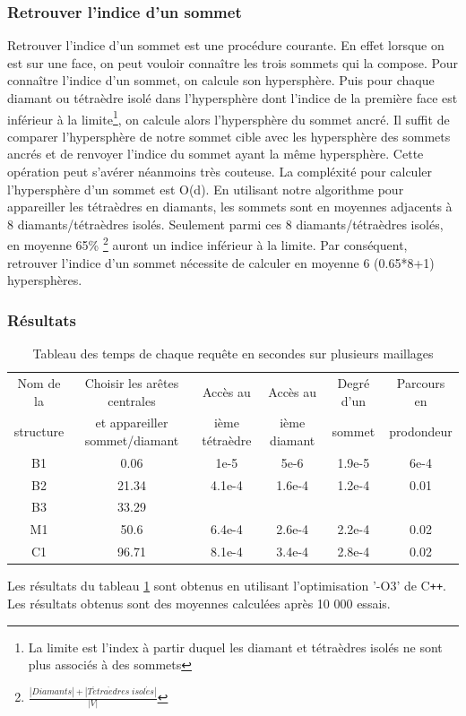 \documentclass[a4paper,11pt,openany]{article}
\begin{document}
\subsubsection{Retrouver l'indice d'un sommet}
\label{Retrouver l'indice d'un sommet}
\noindent
Retrouver l'indice d'un sommet est une procédure courante. En effet lorsque on est sur une face, on peut vouloir connaître les trois sommets qui la compose. Pour connaître l'indice d'un sommet, on calcule son hypersphère. Puis pour chaque diamant ou tétraèdre isolé dans l'hypersphère dont l'indice de la première face est inférieur à la limite\footnote{La limite est l'index à partir duquel les diamant et tétraèdres isolés ne sont plus associés à des sommets}, on calcule alors l'hypersphère du sommet ancré. Il suffit de comparer l'hypersphère de notre sommet cible avec les hypersphère des sommets ancrés et de renvoyer l'indice du sommet ayant la même hypersphère. Cette opération peut s'avérer néanmoins très couteuse. La compléxité pour calculer l'hypersphère d'un sommet est O(d). En utilisant notre algorithme pour appareiller les tétraèdres en diamants, les sommets sont en moyennes adjacents à 8 diamants/tétraèdres isolés. Seulement parmi ces 8 diamants/tétraèdres isolés, en moyenne 65\% \footnote{$\frac{|Diamants|+|T\acute{e}tra\grave{e}dres\; isol\acute{e}s|}{|V|}$} auront un indice inférieur à la limite. Par conséquent, retrouver l'indice d'un sommet nécessite de calculer en moyenne 6 (0.65*8+1) hypersphères.
\subsubsection{Résultats}
\noindent
\begin{table}[H]
\footnotesize
\centering
\begin{tabular}{| c | c | c | c| c |c |}
\hline
Nom de la  & Choisir les arêtes centrales & Accès au& Accès au & Degré d'un & Parcours en\\
structure & et appareiller sommet/diamant &ième tétraèdre& ième diamant &sommet&prodondeur\\
\hline
B1  & 0.06 & 1e-5 & 5e-6 & 1.9e-5 & 6e-4\\
B2 & 21.34 &  4.1e-4 & 1.6e-4 & 1.2e-4 & 0.01\\
B3 & 33.29 & & & & \\
M1  & 50.6 & 6.4e-4 & 2.6e-4 & 2.2e-4 & 0.02\\
C1  & 96.71 & 8.1e-4 & 3.4e-4 & 2.8e-4 & 0.02\\
\hline  
\end{tabular}
\label{Tab:results_time}
\caption{Tableau des temps de chaque requête en secondes sur plusieurs maillages}
\end{table}
\noindent
Les résultats du tableau \ref{Tab:results_time} sont obtenus en utilisant l'optimisation '-O3' de C\texttt{++}. Les résultats obtenus sont des moyennes calculées après 10 000 essais.
\end{document}
